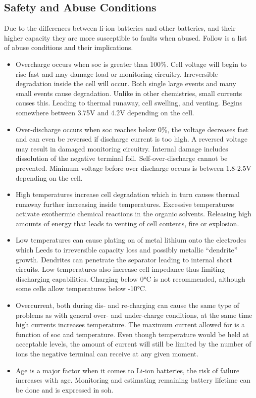 \subsection{Safety and Abuse Conditions}
Due to the differences between \gls{li-ion} batteries and other batteries, and their higher capacity they are more susceptible to faults when abused. Follow is a list of abuse conditions and their implications\cite{book35}.

\begin{itemize}
\item Overcharge occurs when \gls{soc} is greater than 100\%. Cell voltage will begin to rise fast and may damage load or monitoring circuitry. Irreversible degradation inside the cell will occur. Both single large events and many small events cause degradation. Unlike in other chemistries, small currents causes this. Leading to thermal runaway, cell swelling, and venting. Begins somewhere between 3.75V and 4.2V depending on the cell.
\item Over-discharge occurs when \gls{soc} reaches below 0\%, the voltage decreases fast and can even be reversed if discharge current is too high. A reversed voltage may result in damaged monitoring circuitry. Internal damage includes dissolution of the negative terminal foil. Self-over-discharge cannot be prevented. Minimum voltage before over discharge occurs is between 1.8-2.5V depending on the cell.
\item High temperatures increase cell degradation which in turn causes thermal runaway further increasing inside temperatures. Excessive temperatures activate exothermic chemical reactions in the organic solvents. Releasing high amounts of energy that leads to venting of cell contents, fire or explosion.
\item Low temperatures can cause plating on of metal lithium onto the electrodes which Leeds to irreversible capacity loss and possibly metallic “dendrite” growth. Dendrites can penetrate the separator leading to internal short circuits. Low temperatures also increase cell impedance thus limiting discharging capabilities. Charging below 0°C is not recommended, although some cells allow temperatures below -10°C.
\item Overcurrent, both during dis- and re-charging can cause the same type of problems as with general over- and under-charge conditions, at the same time high currents increases temperature. The maximum current allowed for is a function of \gls{soc} and temperature. Even though temperature would be held at acceptable levels, the amount of current will still be limited by the number of ions the negative terminal can receive at any given moment.
\item Age is a major factor when it comes to Li-ion batteries, the risk of failure increases with age. Monitoring and estimating remaining battery lifetime can be done and is expressed in \gls{soh}.
\end{itemize}

